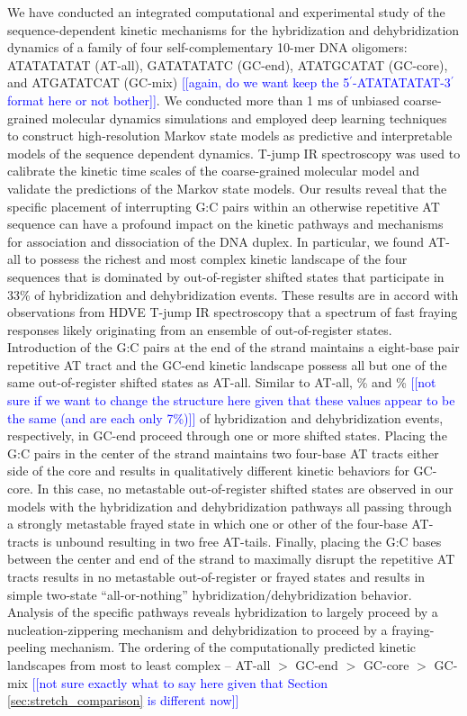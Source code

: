 \documentclass[journal=jpcbfk,manuscript=article]{achemso}
\newcommand*{\rood}[1]{{\color{red}{#1}}}
\newcommand*{\noteb}[1]{\textcolor{blue}{[[#1]]}}		%
\begin{document}
We have conducted an integrated computational and experimental study of the sequence-dependent kinetic mechanisms for the hybridization and dehybridization dynamics of a family of four self-complementary 10-mer DNA oligomers: ATATATATAT (AT-all), GATATATATC (GC-end), ATATGCATAT (GC-core), and ATGATATCAT (GC-mix) \noteb{again, do we want keep the 5$^\prime$-ATATATATAT-3$^\prime$ format here or not bother}. We conducted more than 1 ms of unbiased coarse-grained molecular dynamics simulations and employed deep learning techniques to construct high-resolution Markov state models as predictive and interpretable models of the sequence dependent dynamics. T-jump IR spectroscopy was used to calibrate the kinetic time scales of the coarse-grained molecular model and validate the predictions of the Markov state models. Our results reveal that the specific placement of interrupting G:C pairs within an otherwise repetitive AT sequence can have a profound impact on the kinetic pathways and mechanisms for association and dissociation of the DNA duplex. In particular, we found AT-all to possess the richest and most complex kinetic landscape of the four sequences that is dominated by out-of-register shifted states that participate in 33\% of hybridization and dehybridization events. These results are in accord with observations from HDVE T-jump IR spectroscopy that a spectrum of fast fraying responses likely originating from an ensemble of out-of-register states. Introduction of the G:C pairs at the end of the strand maintains a eight-base pair repetitive AT tract and the GC-end kinetic landscape possess all but one of the same out-of-register shifted states as AT-all. Similar to AT-all, \rood{XX}\% and \rood{XX}\% \noteb{not sure if we want to change the structure here given that these values appear to be the same (and are each only 7\%)} of hybridization and dehybridization events, respectively, in GC-end proceed through one or more shifted states. Placing the G:C pairs in the center of the strand maintains two four-base AT tracts either side of the core and results in qualitatively different kinetic behaviors for GC-core. In this case, no metastable out-of-register shifted states are observed in our models with the hybridization and dehybridization pathways all passing through a strongly metastable frayed state in which one or other of the four-base AT-tracts is unbound resulting in two free AT-tails. Finally, placing the G:C bases between the center and end of the strand to maximally disrupt the repetitive AT tracts results in no metastable out-of-register or frayed states and results in simple two-state ``all-or-nothing'' hybridization/dehybridization behavior. Analysis of the specific pathways reveals hybridization to largely proceed by a nucleation-zippering mechanism and dehybridization to proceed by a fraying-peeling mechanism. The ordering of the computationally predicted kinetic landscapes from most to least complex -- AT-all $>$ GC-end $>$ GC-core $>$ GC-mix \noteb{not sure exactly what to say here given that Section \ref{sec:stretch_comparison} is different now}
\end{document}
